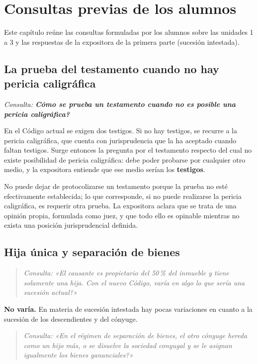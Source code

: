 \documentclass[12pt,oneside]{book}
\begin{document}
\chapter[Consultas previas de los alumnos]{Consultas previas de los alumnos}

Este capítulo reúne las consultas formuladas por los alumnos sobre las unidades 1 a 3 y las respuestas de la expositora de la primera parte (sucesión intestada).

\section{La prueba del testamento cuando no hay pericia caligráfica}

\textit{Consulta: \textbf{\textquestiondown{}Cómo se prueba un testamento cuando no es posible una pericia caligráfica?}}

En el Código actual se exigen dos testigos. Si no hay testigos, se recurre a la pericia caligráfica, que cuenta con jurisprudencia que la ha aceptado cuando faltan testigos. Surge entonces la pregunta por el testamento respecto del cual no existe posibilidad de pericia caligráfica: debe poder probarse por cualquier otro medio, y la expositora entiende que ese medio serían los \textbf{testigos}.

No puede dejar de protocolizarse un testamento porque la prueba no esté efectivamente establecida; lo que corresponde, si no puede realizarse la pericia caligráfica, es requerir otra prueba. La expositora aclara que se trata de una opinión propia, formulada como juez, y que todo ello es opinable mientras no exista una posición jurisprudencial definida.

\section{Hija única y separación de bienes}

\begin{quote}
\textit{Consulta: «El causante es propietario del 50\,\% del inmueble y tiene solamente una hija. Con el nuevo Código, \textquestiondown{}varía en algo lo que sería una sucesión actual?»}
\end{quote}

\textbf{No varía.} En materia de sucesión intestada hay pocas variaciones en cuanto a la sucesión de los descendientes y del cónyuge.

\begin{quote}
\textit{Consulta: «En el régimen de separación de bienes, \textquestiondown{}el otro cónyuge hereda como un hijo más, o se disuelve la sociedad conyugal y se le asignan igualmente los bienes gananciales?»}
\end{quote}
\end{document}
